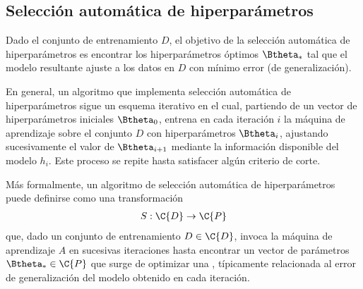 %
%
\subsection{Selección automática de hiperparámetros}
%
Dado el conjunto de entrenamiento $D$, el objetivo de la selección
automática de hiperparámetros es encontrar los hiperparámetros óptimos
$\Btheta_*$ tal que el modelo resultante ajuste a los datos en $D$ con
mínimo error (de generalización).

En general, un algoritmo que implementa selección automática de
hiperparámetros sigue un esquema iterativo en el cual, partiendo de un
vector de hiperparámetros iniciales $\Btheta_0$, entrena en cada
iteración $i$ la máquina de aprendizaje sobre el conjunto $D$ con
hiperparámetros $\Btheta_i$, ajustando sucesivamente el valor de
$\Btheta_{i+1}$ mediante la información disponible del modelo
$h_i$. Este proceso se repite hasta satisfacer algún criterio de
corte.

Más formalmente, un algoritmo de selección automática de
hiperparámetros puede definirse como una transformación
%
\begin{align}
  S:\C{D}\rightarrow\C{P}
\end{align}
%
que, dado un conjunto de entrenamiento ${D}\in\C{D}$, invoca la máquina de
aprendizaje $A$ en sucesivas iteraciones hasta encontrar un vector de
parámetros $\Btheta_*\in\C{P}$ que surge de optimizar una , típicamente relacionada al error de generalización del
modelo obtenido en cada iteración.
